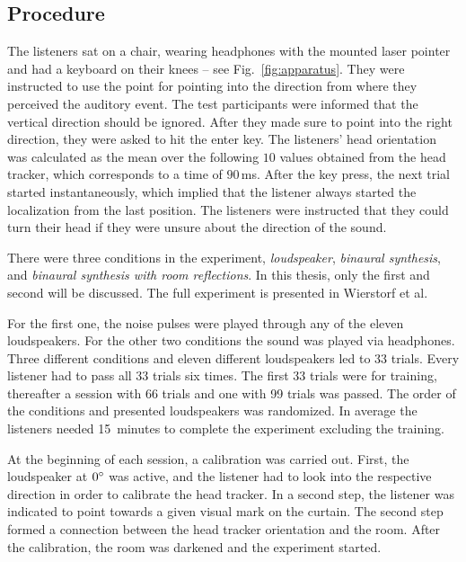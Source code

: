 \subsection{Procedure}
%
The listeners sat on a chair, wearing headphones with the mounted laser
pointer and had a keyboard on their knees -- see Fig.~\ref{fig:apparatus}.
They were instructed to use the point for pointing into the direction from where
they perceived the auditory event.
The test participants were informed that the vertical direction should be
ignored. After they made sure to point into the right direction, they were asked
to hit the enter key.
The listeners' head orientation was calculated as the mean over the
following $10$
values obtained from
the head tracker, which corresponds to a time of $90$\,ms.
After the key press, the next trial started instantaneously, which implied that
the listener always started the localization from the last position.
The listeners were instructed that they could turn their head if they were unsure
about the direction of the sound.

There were three conditions in the experiment, \emph{loudspeaker}, 
\emph{binaural synthesis}, and \emph{binaural synthesis with room reflections}.
In this thesis, only the first and second will be discussed. The full experiment is presented
in Wierstorf et al.\autocite{Wierstorf2012b}

For the first one, the noise pulses were
played through any of the eleven loudspeakers. For the other two conditions the sound
was played via headphones. Three different conditions and eleven
different loudspeakers led to 33 trials.
Every listener had to pass all 33 trials six
times. The first 33 trials were for training, thereafter a session with 66
trials and one with 99 trials was passed. The order of the
conditions and presented loudspeakers was randomized.
In average the listeners needed 15~minutes to complete the experiment
excluding the training.

At the beginning of each session, a calibration was carried out. First, the
loudspeaker at $0^\circ$ was active, and the listener had to look into the
respective direction in order to calibrate the head tracker.
In a second step, the listener
was indicated to point towards a given visual mark on the curtain. The
second step formed a connection between the head tracker orientation and the
room. After the calibration, the room was darkened and the
experiment started.


